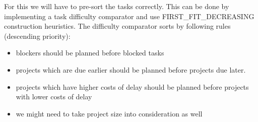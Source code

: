 \documentclass[10pt,a4paper]{article}
\begin{document}
For this we will have to pre-sort the tasks correctly. This can be done by implementing a task difficulty comparator and use FIRST\_FIT\_DECREASING construction heuristics. The difficulty comparator sorts by following rules (descending priority):

\begin{itemize}
\item blockers should be planned before blocked tasks
\item projects which are due earlier should be planned before projects due later.
\item projects which have higher costs of delay should be planned before projects with lower costs of delay
\item we might need to take project size into consideration as well
\end{itemize}
\end{document}
